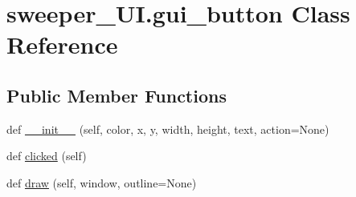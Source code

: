 \hypertarget{classsweeper___u_i_1_1gui__button}{}\section{sweeper\+\_\+\+U\+I.\+gui\+\_\+button Class Reference}
\label{classsweeper___u_i_1_1gui__button}
\subsection*{Public Member Functions}
\begin{DoxyCompactItemize}
\item 
def \mbox{\hyperlink{classsweeper___u_i_1_1gui__button_a0d9c0c788a776c9d8663a285852fe998}{\+\_\+\+\_\+init\+\_\+\+\_\+}} (self, color, x, y, width, height, text, action=None)
\item 
def \mbox{\hyperlink{classsweeper___u_i_1_1gui__button_af74950231e0ddbcb8582404a8320dee5}{clicked}} (self)
\item 
def \mbox{\hyperlink{classsweeper___u_i_1_1gui__button_ae168198450518f00782017759a8879bd}{draw}} (self, window, outline=None)
\end{DoxyCompactItemize}
